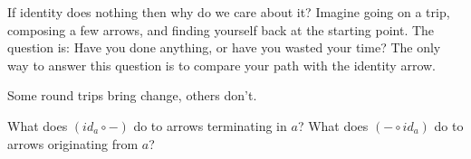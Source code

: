 \documentclass[DaoFP]{subfiles}
\begin{document}
If identity does nothing then why do we care about it? Imagine going on a trip, composing a few arrows, and finding yourself back at the starting point. The question is: Have you done anything, or have you wasted your time? The only way to answer this question is to compare your path with the identity arrow. 

Some round trips bring change, others don't.


\begin{exercise}\label{ex-yoneda-identity}
What does $(id_a \circ -)$ do to arrows terminating in $a$? What does $(- \circ id_a)$ do to arrows originating from $a$?
\end{exercise}
\end{document}
